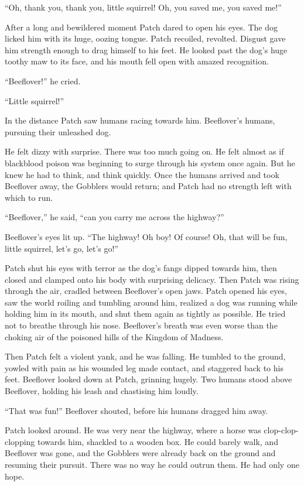 \documentclass[12pt]{memoir}
\begin{document}
“Oh, thank you, thank you, little squirrel! Oh, you saved me, you
saved me!”

After a long and bewildered moment Patch dared to open his eyes. The
dog licked him with its huge, oozing tongue. Patch recoiled,
revolted. Disgust gave him strength enough to drag himself to his
feet. He looked past the dog’s huge toothy maw to its face, and his
mouth fell open with amazed recognition.

“Beeflover!” he cried.

“Little squirrel!”

In the distance Patch saw humans racing towards him. Beeflover’s
humans, pursuing their unleashed dog.

He felt dizzy with surprise. There was too much going on. He felt
almost as if blackblood poison was beginning to surge through his
system once again. But he knew he had to think, and think
quickly. Once the humans arrived and took Beeflover away, the Gobblers
would return; and Patch had no strength left with which to run.

“Beeflover,” he said, “can you carry me across the highway?”

Beeflover’s eyes lit up. “The highway! Oh boy! Of course! Oh, that
will be fun, little squirrel, let’s go, let’s go!”

Patch shut his eyes with terror as the dog’s fangs dipped towards him,
then closed and clamped onto his body with surprising delicacy. Then
Patch was rising through the air, cradled between Beeflover’s open
jaws. Patch opened his eyes, saw the world roiling and tumbling around
him, realized a dog was running while holding him in its mouth, and
shut them again as tightly as possible. He tried not to breathe
through his nose. Beeflover’s breath was even worse than the choking
air of the poisoned hills of the Kingdom of Madness.

Then Patch felt a violent yank, and he was falling. He tumbled to the
ground, yowled with pain as his wounded leg made contact, and
staggered back to his feet. Beeflover looked down at Patch, grinning
hugely. Two humans stood above Beeflover, holding his leash and
chastising him loudly.

“That was fun!” Beeflover shouted, before his humans dragged him away.

Patch looked around. He was very near the highway, where a horse was
clop-clop-clopping towards him, shackled to a wooden box. He could
barely walk, and Beeflover was gone, and the Gobblers were already
back on the ground and resuming their pursuit. There was no way he
could outrun them. He had only one hope.
\end{document}
